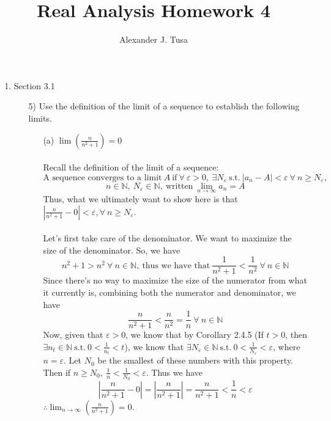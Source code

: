 \documentclass[12pt,letterpaper]{article}
\author{Alexander J. Tusa}
\title{Real Analysis Homework 4}
\newcommand{\st}{\ \text{s.t.}\ }
\newcommand{\abs}[1]{\left\lvert #1 \right\rvert}
\theoremstyle{case}
\begin{document}
	\maketitle
	\begin{enumerate}
		\item Section 3.1
		\begin{enumerate}
			\item[5)] Use the definition of the limit of a sequence to establish the following limits.
				\begin{enumerate}
					\item[(a)] $\lim (\frac{n}{n^2+1})=0$
					\\\\Recall the definition of the limit of a sequence:
					$$\text{A sequence converges to a limit}\ A\ \text{if}\ \forall \ \varepsilon > 0,\ \exists N_\varepsilon\ \text{s.t.}\ |a_n-A|<\varepsilon\ \forall \ n \geq N_\varepsilon,$$
					$$n \in \mathbb{N},\ N_\varepsilon \in \mathbb{N},\ \text{written}\ \lim_{n\to\infty} a_n = A$$
					Thus, what we ultimately want to show here is that $|\frac{n}{n^2+1}-0| < \varepsilon, \forall \ n \geq N_\varepsilon$.
					\\\\Let's first take care of the denominator. We want to maximize the size of the denominator. So, we have 
					$$n^2+1 > n^2\ \forall\ n \in \mathbb{N},\ \text{thus we have that}\ \frac{1}{n^2+1} < \frac{1}{n^2}\ \forall \ n \in \mathbb{N}$$
					Since there's no way to maximize the size of the numerator from what it currently is, combining both the numerator and denominator, we have
					$$\frac{n}{n^2+1} < \frac{n}{n^2}=\frac{1}{n}\ \forall \ n \in \mathbb{N}$$
					Now, given that $\varepsilon > 0$, we know that by Corollary 2.4.5 (If $t > 0$, then $\exists n_t \in \mathbb{N}\ \text{s.t.}\ 0 < \frac{1}{n_t} < t$), we know that $\exists N_\varepsilon \in \mathbb{N} \st 0 < \frac{1}{N_\varepsilon} < \varepsilon$, where $n=\varepsilon$. Let $N_0$ be the smallest of these numbers with this property. Then if $n \geq N_0,\ \frac{1}{n} < \frac{1}{N_0} < \varepsilon$. Thus we have 
					$$\abs{\frac{n}{n^2 + 1}-0}=\abs{\frac{n}{n^2+1}} = \frac{n}{n^2+1} < \frac{1}{n} < \varepsilon$$
					$\therefore \lim_{n\to\infty} (\frac{n}{n^2+1}) = 0$.
					

\end{enumerate}
\end{enumerate}
\end{enumerate}
\end{document}
